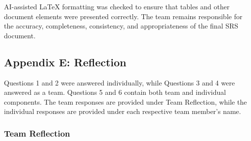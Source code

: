\documentclass[10pt]{article}
\begin{document}
AI-assisted \LaTeX{} formatting was checked to ensure
that tables and other document elements were presented
correctly. The team remains responsible for the accuracy,
completeness, consistency, and appropriateness of the
final SRS document.

\newpage
\subsection{Appendix E: Reflection}

Questions 1 and 2 were answered individually, while Questions 3 and 4 were
answered as a team. Questions 5 and 6 contain both team and individual
components. The team responses are provided under Team Reflection, while the
individual responses are provided under each respective team member's name.

\subsubsection*{Team Reflection}
\end{document}
